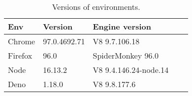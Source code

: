 
\begin{wraptable}{r}{7.5cm}
    \vspace{-0.75cm}
    \caption{Versions of environments.}
    \label{tab:versions}
    \setlength{\tabcolsep}{0.5em}
    \begin{tabular}{lllll}%
        \hline
        Env     & Version      & Engine version           \\
        \hline
        Chrome  & 97.0.4692.71 & V8 9.7.106.18            \\
        Firefox & 96.0         & SpiderMonkey  96.0       \\
        Node    & 16.13.2      & V8    9.4.146.24-node.14 \\
        Deno    & 1.18.0       & V8      9.8.177.6        \\
        \hline
    \end{tabular}
    \vspace{-0.5cm}
\end{wraptable}
